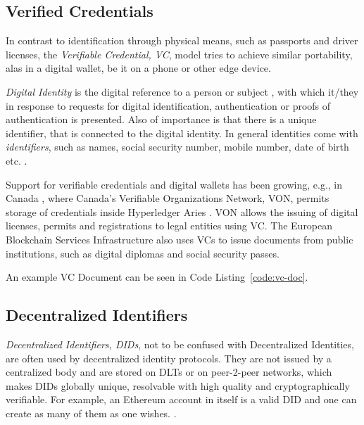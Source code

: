 \subsection{Verified Credentials} %
\label{sub:Verified Credentials}
In contrast to identification through physical means, such as passports and driver licenses, the
\textit{Verifiable Credential, VC}, model tries to achieve similar portability, alas in a digital wallet, be it on a
phone or other edge device. \cite{w3c2019verifiablecredentials}

\textit{Digital Identity} is the digital reference to a person or subject \cite{Domingo_2020}, with which it/they in
response to requests for digital identification, authentication or proofs of authentication is presented. Also of
importance is that there is a unique identifier, that is connected to the digital identity.
\cite{Sedlmeir_Smethurst_Rieger_Fridgen_2021}
In general identities come with \textit{identifiers}, such as names, social security number, mobile number, date of
birth etc. \cite{eth-decentralized-identity}.

Support for verifiable credentials and digital wallets has been growing, e.g., in Canada \cite{preukschat2021self},
where Canada's Verifiable Organizations Network, VON, permits storage of credentials inside Hyperledger Aries
\cite{hyperledger:wiki}. VON allows the issuing of digital licenses, permits and registrations to legal entities using
VC.
The European Blockchain Services Infrastructure also uses VCs to issue documents from public institutions, such as
digital diplomas and social security passes. \cite{williams2020cross}

An example VC Document can be seen in Code Listing~\ref{code:vc-doc}.

\subsection{Decentralized Identifiers} %
\label{sec:Decentralized Identifiers}
\textit{Decentralized Identifiers, DIDs}, not to be confused with Decentralized Identities, are often used by
decentralized identity protocols. \cite{w3c2022did} They are not issued by a centralized body and are stored on DLTs
or on peer-2-peer networks, which makes DIDs globally unique, resolvable with high quality and cryptographically
verifiable. \cite{w3c-did-primer} For example, an Ethereum account in itself is a valid DID and one can create as many
of them as one wishes. \cite{eth-decentralized-identity}.

